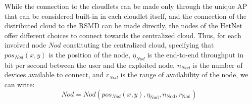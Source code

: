 \documentclass[twoside,openright]{report}
\begin{document}
While the connection to the cloudlets can be made only through the unique \gls{AP} that can be considered built-in in each cloudlet itself, and the connection of the distributed cloud to the \gls{RSMD} can be made directly, the nodes of the \gls{HetNet} offer different choices to connect towards the centralized cloud. Thus, for each involved node $\textit{Nod}$ constituting the centralized cloud, specifying that $pos_\textit{Nod}(x,y)$ is the position of the node, $\eta_\textit{Nod}$ is the end-to-end throughput in bit per second  between the user and the exploited node, $n_\textit{Nod}$ is the number of devices available to connect, and $r_\textit{Nod}$ is the range of availability of the node, we can write:
\begin{equation}
\label{eq:Nod}
\textit{Nod} = \textit{Nod}(pos_{\textit{Nod}}(x, y), \eta_{\text{Nod}} ,  n_{\text{Nod}},  r_{\text{Nod}})
\end{equation} 
\end{document}
